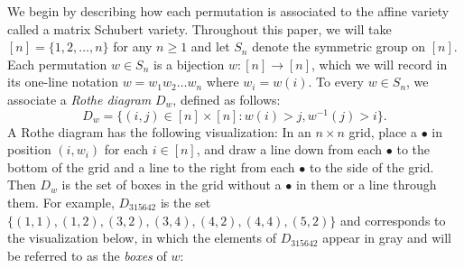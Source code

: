 We begin by describing how each permutation is associated to the affine variety called a matrix Schubert variety.  Throughout this paper, we will take  $[n] = \{1,2,\dots,n\}$  for any $n \geq 1$ and let $S_n$ denote the symmetric group on $[n]$.  Each permutation $w \in S_n$ is a bijection $w:[n] \rightarrow [n]$, which we will record in its one-line notation $w = w_1 w_2 \dots w_n$ where $w_i = w(i)$.  To every $w \in S_n$, we associate a \emph{Rothe diagram} $D_w$, defined as follows:
\[
D_w = \{(i,j) \in [n] \times [n]: w(i) > j, w^{-1}(j) > i\}.
\]
A Rothe diagram has the following visualization: In an $n \times n$ grid, place a $\bullet$ in position $(i,w_i)$ for each $i \in [n]$, and draw a line down from each $\bullet$ to the bottom of the grid and a line to the right from each $\bullet$ to the side of the grid.  Then $D_w$ is the set of boxes in the grid without a $\bullet$ in them or a line through them.
For example, $D_{315642}$ is the set $\{(1,1),(1,2),(3,2),(3,4),(4,2),(4,4),(5,2)\}$ and corresponds to the visualization below, in which the elements of $D_{315642}$ appear in gray and will be referred to as the \emph{boxes} of $w$:
